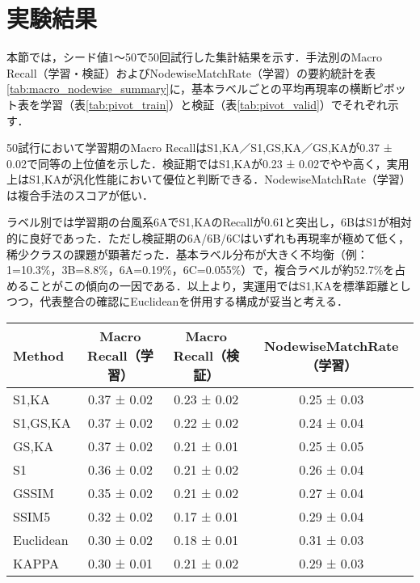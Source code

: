 \documentclass{jarticle}
\theoremstyle{definition}
\begin{document}
\section{実験結果}
本節では，シード値1〜50で50回試行した集計結果を示す．手法別のMacro Recall（学習・検証）およびNodewiseMatchRate（学習）の要約統計を表\ref{tab:macro_nodewise_summary}に，基本ラベルごとの平均再現率の横断ピボット表を学習（表\ref{tab:pivot_train}）と検証（表\ref{tab:pivot_valid}）でそれぞれ示す．

50試行において学習期のMacro RecallはS1,KA／S1,GS,KA／GS,KAが0.37 ± 0.02で同等の上位値を示した．検証期ではS1,KAが0.23 ± 0.02でやや高く，実用上はS1,KAが汎化性能において優位と判断できる．NodewiseMatchRate（学習）は複合手法のスコアが低い．

ラベル別では学習期の台風系6AでS1,KAのRecallが0.61と突出し，6BはS1が相対的に良好であった．ただし検証期の6A/6B/6Cはいずれも再現率が極めて低く，稀少クラスの課題が顕著だった．基本ラベル分布が大きく不均衡（例：1=10.3\%，3B=8.8\%，6A=0.19\%，6C=0.055\%）で，複合ラベルが約52.7\%を占めることがこの傾向の一因である．以上より，実運用ではS1,KAを標準距離としつつ，代表整合の確認にEuclideanを併用する構成が妥当と考える．

\clearpage


\begin{table*}[t!]
\centering
\caption{手法別 Macro Recall（学習・検証）と NodewiseMatchRate（学習）の統計量（平均±標準偏差, N=50）}
\label{tab:macro_nodewise_summary}
\footnotesize
\begin{tabular}{lccc}
\hline
Method & Macro Recall（学習） & Macro Recall（検証） & NodewiseMatchRate（学習） \\
\hline
S1,KA      & 0.37 ± 0.02 & 0.23 ± 0.02 & 0.25 ± 0.03 \\
S1,GS,KA   & 0.37 ± 0.02 & 0.22 ± 0.02 & 0.24 ± 0.04 \\
GS,KA      & 0.37 ± 0.02 & 0.21 ± 0.01 & 0.25 ± 0.05 \\
S1         & 0.36 ± 0.02 & 0.21 ± 0.02 & 0.26 ± 0.04 \\
GSSIM      & 0.35 ± 0.02 & 0.21 ± 0.02 & 0.27 ± 0.04 \\
SSIM5      & 0.32 ± 0.02 & 0.17 ± 0.01 & 0.29 ± 0.04 \\
Euclidean  & 0.30 ± 0.02 & 0.18 ± 0.01 & 0.31 ± 0.03 \\
KAPPA      & 0.30 ± 0.01 & 0.21 ± 0.02 & 0.29 ± 0.03 \\
\hline
\end{tabular}
\end{table*}
\end{document}
